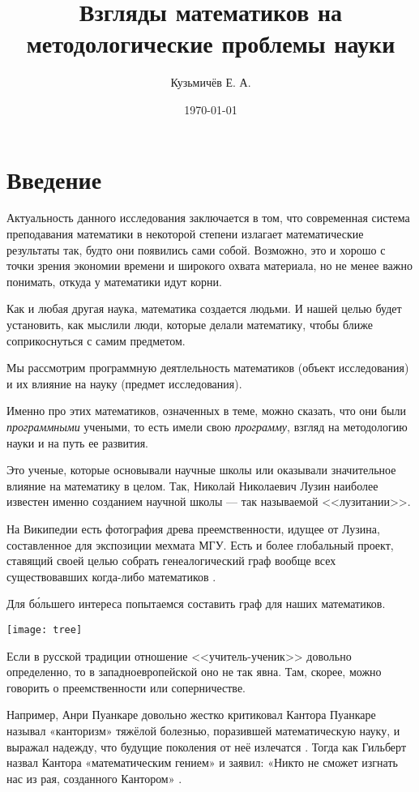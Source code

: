 \documentclass[a4paper,14pt]{article}
\author{Кузьмичёв Е. А.}
\title{Взгляды математиков на методологические проблемы науки}
\date{\today}
\begin{document}

\tableofcontents

\section{Введение}

Актуальность данного исследования заключается в том, что современная система преподавания математики в некоторой степени излагает математические результаты так, будто они появились сами собой. Возможно, это и хорошо с точки зрения экономии времени и широкого охвата материала, но не менее важно понимать, откуда у математики идут корни. 

Как и любая другая наука, математика создается людьми. И нашей целью будет установить, как мыслили люди, которые делали математику, чтобы ближе соприкоснуться с самим предметом.

Мы рассмотрим программную деятлельность математиков (объект исследования) и их влияние на науку (предмет исследования).

Именно про этих математиков, означенных в теме, можно сказать, что они были \textit{программными} учеными, то есть имели свою \textit{программу}, взгляд на методологию науки и на путь ее развития.

Это ученые, которые основывали научные школы или оказывали значительное влияние на математику в целом. Так, Николай Николаевич Лузин наиболее известен именно созданием научной школы --- так называемой <<лузитании>>.

На Википедии есть фотография древа преемственности, идущее от Лузина, составленное для экспозиции мехмата МГУ. Есть и более глобальный проект, ставящий своей целью собрать генеалогический граф вообще всех существовавших когда-либо математиков \cite{mathgen}.

Для б\'{о}льшего интереса попытаемся составить граф для наших математиков.

\texttt{[image: tree]}

Если в русской традиции отношение <<учитель-ученик>> довольно определенно, то в западноевропейской оно не так явна. Там, скорее, можно говорить о преемственности или соперничестве.

Например, Анри Пуанкаре довольно жестко критиковал Кантора Пуанкаре называл «канторизм» тяжёлой болезнью, поразившей математическую науку, и выражал надежду, что будущие поколения от неё излечатся \cite{wiki_cantor}. Тогда как Гильберт назвал Кантора «математическим гением» и заявил: «Никто не сможет изгнать нас из рая, созданного Кантором» \cite{wiki_cantor}.
\end{document}

